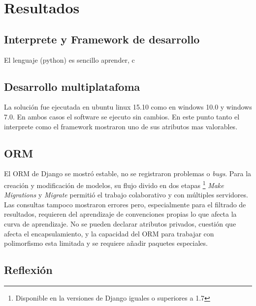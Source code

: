 \documentclass[twoside,twocolumn]{article}
\begin{document}
\section{Resultados}
\label{sec:resultados}


\subsection{Interprete y Framework de desarrollo}
El lenguaje (python) es sencillo aprender, c

\subsection{Desarrollo multiplatafoma}
La solución fue ejecutada en ubuntu linux 15.10 como en windows 10.0 y windows 7.0. En ambos casos el software se ejecuto sin cambios. En este punto tanto el interprete como el framework mostraron uno de sus atributos mas valorables.


\subsection{ORM}
El ORM de Django se mostró estable, no se registraron problemas o \textit{bugs}. Para la creación y modificación de modelos, su flujo divido en dos etapas \footnote{Disponible en la versiones de Django iguales o superiores a 1.7} \textit{Make Migrations} y \textit{Migrate} permitió el trabajo colaborativo y con múltiples servidores. Las consultas tampoco mostraron errores pero, especialmente para el filtrado de resultados, requieren del aprendizaje de convenciones propias lo que afecta la curva de aprendizaje. No se pueden declarar atributos privados, cuestión que afecta el encapsulamiento, y la capacidad del ORM para trabajar con polimorfismo esta limitada y se requiere añadir paquetes especiales.

\subsection{Reflexión}



\end{document}
